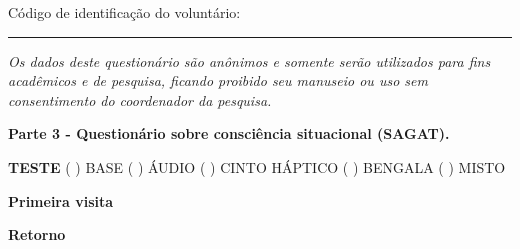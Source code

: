 {\color{gray}

Código de identificação do voluntário: \rule{1in}{.2mm}

\textit{Os dados deste questionário são anônimos e somente serão utilizados para fins acadêmicos e de pesquisa, ficando proibido seu manuseio ou uso sem consentimento do coordenador da pesquisa.}
}

\begin{center}
\textbf{Parte 3 - Questionário sobre consciência situacional (SAGAT).}
\end{center}

\noindent
\textbf{TESTE} ( ) BASE \hfill ( ) ÁUDIO \hfill ( ) CINTO HÁPTICO \hfill ( ) BENGALA \hfill ( ) MISTO

\textbf{Primeira visita}

\hspace{0.5cm}



\FloatBarrier

\textbf{Retorno}

\hspace{0.5cm}



\FloatBarrier
\pagebreak

